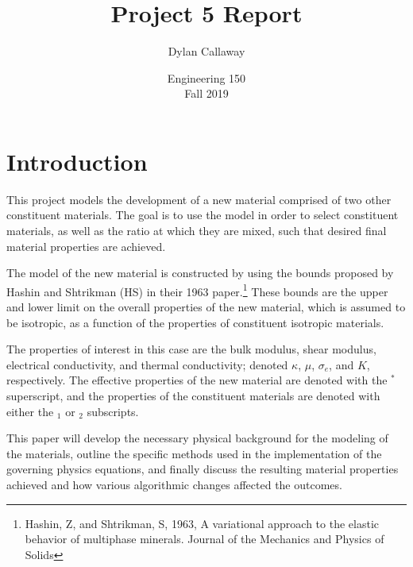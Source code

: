 \documentclass[a4paper,12pt]{report}
\begin{document}
\setlength{\abovedisplayskip}{6pt}
\setlength{\belowdisplayskip}{8pt}
\setlength{\abovedisplayshortskip}{2pt}
\setlength{\belowdisplayshortskip}{8pt}

\title{Project 5 Report}
\author{Dylan Callaway}
\date{Engineering 150 \\ Fall 2019}
\maketitle

\tableofcontents
\newpage
{}

\newenvironment{nscenter}
 {\setlength{\topsep}{0ex}\trivlist\item\relax\centering}
 {\endtrivlist}

\section{Introduction}
This project models the development of a new material comprised of two other constituent materials. The goal is to use the model in order to select constituent materials, as well as the ratio at which they are mixed, such that desired final material properties are achieved.

The model of the new material is constructed by using the bounds proposed by Hashin and Shtrikman (HS) in their 1963 paper.\footnote{Hashin, Z, and Shtrikman, S, 1963, A variational approach to the elastic behavior of multiphase minerals. Journal of the Mechanics and Physics of Solids} These bounds are the upper and lower limit on the overall properties of the new material, which is assumed to be isotropic, as a function of the properties of constituent isotropic materials.

The properties of interest in this case are the bulk modulus, shear modulus, electrical conductivity, and thermal conductivity; denoted $\kappa$, $\mu$, $\sigma_e$, and $K$, respectively. The effective properties of the new material are denoted with the $^*$ superscript, and the properties of the constituent materials are denoted with either the $_1$ or $_2$ subscripts.

This paper will develop the necessary physical background for the modeling of the materials, outline the specific methods used in the implementation of the governing physics equations, and finally discuss the resulting material properties achieved and how various algorithmic changes affected the outcomes.
\end{document}
